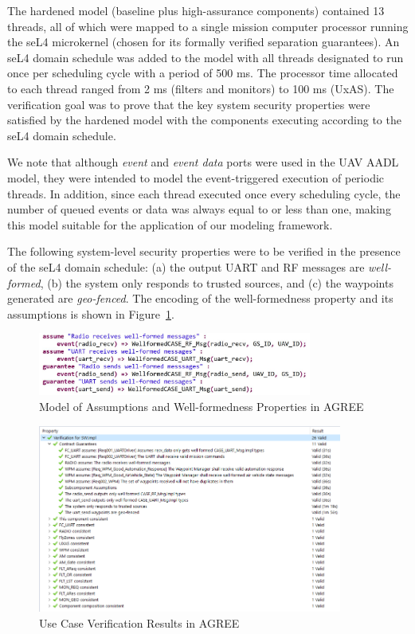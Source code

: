 The hardened model (baseline plus high-assurance components) contained 13 threads,
all of which were mapped to a single mission computer processor running the seL4 microkernel (chosen for its formally verified separation guarantees).
An seL4 domain schedule was added to the model with all threads designated to run once per scheduling cycle with a period of 500 ms.
The processor time allocated to each thread ranged from 2 ms (filters and monitors) to 100 ms (UxAS).
The verification goal was to prove that the key system security properties were satisfied by the hardened model with the components executing according to the seL4 domain schedule.

We note that although \textit{event} and \textit{event data} ports were used in the UAV AADL model, they were intended to model the event-triggered execution of periodic threads.
In addition, since each thread executed once every scheduling cycle, the number of queued events or data was always equal to or less than one,
making this model suitable for the application of our modeling framework.

The following system-level security properties were to be verified in the presence of the seL4 domain schedule:
(a) the output UART and RF messages are \emph{well-formed},
(b) the system only responds to trusted sources, and
(c) the waypoints generated are \emph{geo-fenced}.
The encoding of the well-formedness property and its assumptions is shown in Figure~\ref{wellformed}. 

\begin{figure}[t!]
\centering
\includegraphics[width=90mm]{wellformed.jpg}
\caption{Model of Assumptions and Well-formedness Properties in AGREE \label{wellformed}}
\end{figure}

\begin{figure}[t!]
\centering
\includegraphics[width=100mm]{proof.png}
\caption{Use Case Verification Results in AGREE \label{proof}}
\end{figure}

